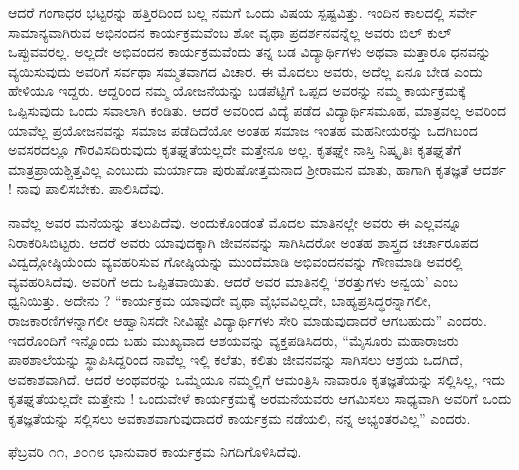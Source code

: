 {ಆದರೆ ಗಂಗಾಧರ ಭಟ್ಟರನ್ನು ಹತ್ತಿರದಿಂದ ಬಲ್ಲ ನಮಗೆ ಒಂದು ವಿಷಯ ಸ್ಪಷ್ಟವಿತ್ತು. ಇಂದಿನ ಕಾಲದಲ್ಲಿ ಸರ್ವೇ ಸಾಮಾನ್ಯವಾಗಿರುವ ಅಭಿನಂದನ ಕಾರ್ಯಕ್ರಮವೆಂಬ ಶೋ \enginline{-} ವೃಥಾ ಪ್ರದರ್ಶನವನ್ನೆಲ್ಲ ಅವರು ಬಿಲ್ ಕುಲ್ ಒಪ್ಪುವವರಲ್ಲ. ಅಲ್ಲದೇ ಅಭಿವಂದನ ಕಾರ್ಯಕ್ರಮವೆಂದು ತನ್ನ ಬಡ ವಿದ್ಯಾರ್ಥಿಗಳು ಅಥವಾ \hbox{ಮತ್ತಾರೂ} ಧನವನ್ನು ವ್ಯಯಿಸುವುದು ಅವರಿಗೆ ಸರ್ವಥಾ ಸಮ್ಮತವಾಗದ ವಿಚಾರ. ಈ ಮೊದಲು ಅವರು, ಅದೆಲ್ಲ ಏನೂ ಬೇಡ ಎಂದು ಹೇಳಿಯೂ ಇದ್ದರು.  ಆದ್ದರಿಂದ ನಮ್ಮ ಯೋಜನೆಯನ್ನು ಬಡಪೆಟ್ಟಿಗೆ ಒಪ್ಪದ  ಅವರನ್ನು ನಮ್ಮ ಕಾರ್ಯಕ್ರಮಕ್ಕೆ ಒಪ್ಪಿಸುವುದು ಒಂದು ಸವಾಲಾಗಿ ಕಂಡಿತು. ಆದರೆ ಅವರಿಂದ ವಿದ್ಯೆ ಪಡೆದ ವಿದ್ಯಾರ್ಥಿಸಮೂಹ, ಮಾತ್ರವಲ್ಲ  ಅವರಿಂದ ಯಾವೆಲ್ಲ ಪ್ರಯೋಜನವನ್ನು ಸಮಾಜ ಪಡೆದಿದೆಯೋ ಅಂತಹ ಸಮಾಜ ಇಂತಹ ಮಹನೀಯರನ್ನು ಒದಗಿಬಂದ ಅವಸರದಲ್ಲೂ  ಗೌರವಿಸದಿರುವುದು ಕೃತಘ್ನತೆಯಲ್ಲದೇ ಮತ್ತೇನೂ ಅಲ್ಲ. ಕೃತಘ್ನೇ ನಾಸ್ತಿ ನಿಷ್ಕೃತಿಃ \enginline{-} ಕೃತಘ್ನತೆಗೆ ಮಾತ್ರ\break ಪ್ರಾಯಶ್ಚಿತ್ತವಿಲ್ಲ ಎಂಬುದು ಮರ್ಯಾದಾ ಪುರುಷೋತ್ತಮನಾದ ಶ್ರೀರಾಮನ ಮಾತು, ಹಾಗಾಗಿ ಕೃತಜ್ಞತೆ ಆದರ್ಶ ! ನಾವು ಪಾಲಿಸಬೇಕು. ಪಾಲಿಸಿದೆವು.

ನಾವೆಲ್ಲ ಅವರ ಮನೆಯನ್ನು ತಲುಪಿದೆವು. ಅಂದುಕೊಂಡಂತೆ ಮೊದಲ \hbox{ಮಾತಿನಲ್ಲೇ} ಅವರು ಈ ಎಲ್ಲವನ್ನೂ ನಿರಾಕರಿಸಿಬಿಟ್ಟರು. ಆದರೆ ಅವರು ಯಾವುದಕ್ಕಾಗಿ ಜೀವನವನ್ನು ಸಾಗಿಸಿದರೋ ಅಂತಹ ಶಾಸ್ತ್ರದ ಚರ್ಚಾರೂಪದ \enginline{-} \hbox{ವಿದ್ವದ್ಗೋಷ್ಠಿಯೆಂದು} ವ್ಯವಹರಿಸುವ ಗೋಷ್ಠಿಯನ್ನು ಮುಂದೆಮಾಡಿ ಅಭಿವಂದನವನ್ನು ಗೌಣಮಾಡಿ ಅವರಲ್ಲಿ ವ್ಯವಹರಿಸಿದೆವು. ಅವರಿಗೆ ಅದು ಒಪ್ಪಿತವಾಯಿತು. ಆದರೆ ಅವರ ಮಾತಿನಲ್ಲಿ ‘ಶರತ್ತು\-ಗಳು ಅನ್ವಯ’ ಎಂಬ ಧ್ವನಿಯಿತ್ತು. ಅದೇನು ? \enginline{-} “ಕಾರ್ಯಕ್ರಮ ಯಾವುದೇ ವೃಥಾ ವೈಭವ\-ವಿಲ್ಲದೇ, ಬಾಹ್ಯಪ್ರಸಿದ್ಧರನ್ನಾಗಲೀ, ರಾಜಕಾರಣಿಗಳನ್ನಾಗಲೀ ಆಹ್ವಾನಿಸದೇ ನೀವಿಷ್ಟೇ ವಿದ್ಯಾರ್ಥಿಗಳು ಸೇರಿ ಮಾಡುವುದಾದರೆ ಆಗಬಹುದು” ಎಂದರು. ಇದರೊಂದಿಗೆ ಇನ್ನೊಂದು ಬಹು ಮುಖ್ಯವಾದ ಆಶಯವನ್ನು ವ್ಯಕ್ತಪಡಿಸಿದರು, \enginline{-} “ಮೈಸೂರು ಮಹಾರಾಜರು ಪಾಠಶಾಲೆಯನ್ನು ಸ್ಥಾಪಿಸಿದ್ದರಿಂದ ನಾವೆಲ್ಲ ಇಲ್ಲಿ \hbox{ಕಲೆತು}, ಕಲಿತು ಜೀವನವನ್ನು ಸಾಗಿಸಲು ಆಶ್ರಯ ಒದಗಿದೆ, ಅವಕಾಶವಾಗಿದೆ. ಆದರೆ ಅಂಥವರನ್ನು ಒಮ್ಮೆಯೂ ನಮ್ಮಲ್ಲಿಗೆ ಆಮಂತ್ರಿಸಿ ನಾವಾರೂ ಕೃತಜ್ಞತೆಯನ್ನು ಸಲ್ಲಿಸಿಲ್ಲ, ಇದು \hbox{ಕೃತಘ್ನತೆ}ಯಲ್ಲದೇ ಮತ್ತೇನು ! ಒಂದುವೇಳೆ ಕಾರ್ಯಕ್ರಮಕ್ಕೆ ಅರಮನೆಯವರು ಆಗಮಿಸಲು ಸಾಧ್ಯವಾಗಿ ಅವರಿಗೆ ಒಂದು ಕೃತಜ್ಞತೆಯನ್ನು ಸಲ್ಲಿಸಲು ಅವಕಾಶವಾಗುವು\-ದಾದರೆ ಕಾರ್ಯಕ್ರಮ ನಡೆಯಲಿ, ನನ್ನ ಅಭ್ಯಂತರವಿಲ್ಲ” ಎಂದರು. 

ಫೆಬ್ರವರಿ ೧೧, ೨೦೧೮ \enginline{-} ಭಾನುವಾರ ಕಾರ್ಯಕ್ರಮ ನಿಗದಿಗೊಳಿಸಿದೆವು.

}
